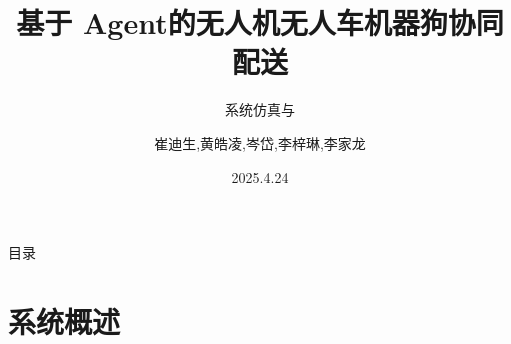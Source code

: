\documentclass[
10pt,
aspectratio=169,
]{beamer}
\title{基于 {\calligra Agent}的无人机无人车机器狗协同配送}
\subtitle{系统仿真与}
\author[崔迪生,黄皓凌,岑岱,李梓琳,李家龙]
{崔迪生,黄皓凌,岑岱,李梓琳,李家龙}
\institute[中山大学]{中山大学\\
系统科学与工程学院\\
指导老师：李雄
}
\date{2025.4.24}
\begin{document}
\maketitle

\begin{frame}
    {目录}
    \begin{multicols}{2}
        \tableofcontents
        \end{multicols}
\end{frame}






\section{系统概述}
\end{document}
